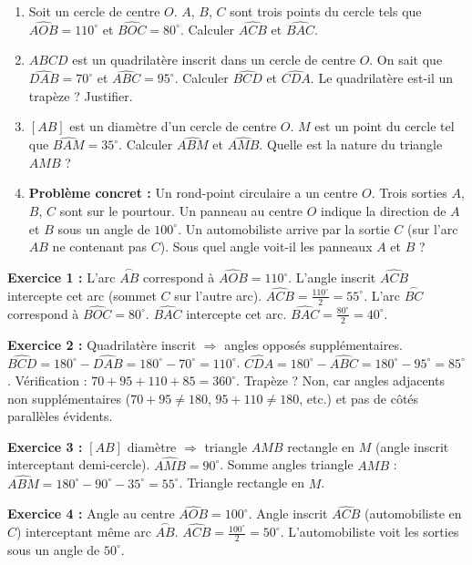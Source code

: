 \documentclass[11pt]{article}
\begin{document}
\begin{exercice}
\begin{enumerate}
\item Soit un cercle de centre $O$. $A$, $B$, $C$ sont trois points du cercle tels que $\widehat{AOB} = 110^\circ$ et $\widehat{BOC} = 80^\circ$. Calculer $\widehat{ACB}$ et $\widehat{BAC}$.
\item $ABCD$ est un quadrilatère inscrit dans un cercle de centre $O$. On sait que $\widehat{DAB} = 70^\circ$ et $\widehat{ABC} = 95^\circ$. Calculer $\widehat{BCD}$ et $\widehat{CDA}$. Le quadrilatère est-il un trapèze ? Justifier.
\item $[AB]$ est un diamètre d'un cercle de centre $O$. $M$ est un point du cercle tel que $\widehat{BAM} = 35^\circ$. Calculer $\widehat{ABM}$ et $\widehat{AMB}$. Quelle est la nature du triangle $AMB$ ?
\item \textbf{Problème concret :} Un rond-point circulaire a un centre $O$. Trois sorties $A$, $B$, $C$ sont sur le pourtour. Un panneau au centre $O$ indique la direction de $A$ et $B$ sous un angle de $100^\circ$. Un automobiliste arrive par la sortie $C$ (sur l'arc $AB$ ne contenant pas $C$). Sous quel angle voit-il les panneaux $A$ et $B$ ?
\end{enumerate}
\end{exercice}

\begin{corrige}
\textbf{Exercice 1 :}
L'arc $\overset{\frown}{AB}$ correspond à $\widehat{AOB}=110^\circ$. L'angle inscrit $\widehat{ACB}$ intercepte cet arc (sommet $C$ sur l'autre arc).
$\widehat{ACB} = \frac{110^\circ}{2} = 55^\circ$.
L'arc $\overset{\frown}{BC}$ correspond à $\widehat{BOC}=80^\circ$. $\widehat{BAC}$ intercepte cet arc.
$\widehat{BAC} = \frac{80^\circ}{2} = 40^\circ$.

\textbf{Exercice 2 :}
Quadrilatère inscrit $\Rightarrow$ angles opposés supplémentaires.
$\widehat{BCD} = 180^\circ - \widehat{DAB} = 180^\circ - 70^\circ = 110^\circ$.
$\widehat{CDA} = 180^\circ - \widehat{ABC} = 180^\circ - 95^\circ = 85^\circ$.
Vérification : $70+95+110+85 = 360^\circ$.
Trapèze ? Non, car angles adjacents non supplémentaires ($70+95 \neq 180$, $95+110 \neq 180$, etc.) et pas de côtés parallèles évidents.

\textbf{Exercice 3 :}
$[AB]$ diamètre $\Rightarrow$ triangle $AMB$ rectangle en $M$ (angle inscrit interceptant demi-cercle).
$\widehat{AMB} = 90^\circ$.
Somme angles triangle $AMB$ : $\widehat{ABM} = 180^\circ - 90^\circ - 35^\circ = 55^\circ$.
Triangle rectangle en $M$.

\textbf{Exercice 4 :}
Angle au centre $\widehat{AOB} = 100^\circ$. Angle inscrit $\widehat{ACB}$ (automobiliste en $C$) interceptant même arc $\overset{\frown}{AB}$.
$\widehat{ACB} = \frac{100^\circ}{2} = 50^\circ$.
L'automobiliste voit les sorties sous un angle de $50^\circ$.
\end{corrige}
\end{document}

